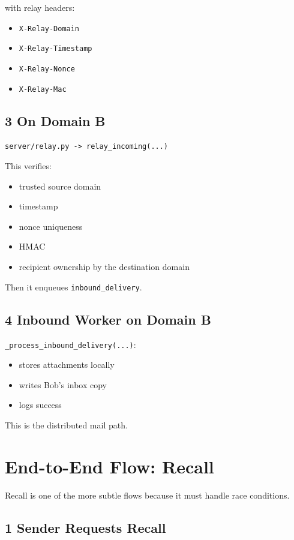 \documentclass[11pt,a4paper]{article}
\begin{document}
with relay headers:

\begin{itemize}
\item \nolinkurl{X-Relay-Domain}
\item \nolinkurl{X-Relay-Timestamp}
\item \nolinkurl{X-Relay-Nonce}
\item \nolinkurl{X-Relay-Mac}
\end{itemize}

\subsection{3 On Domain B}

\nolinkurl{server/relay.py -> relay_incoming(...)}

This verifies:

\begin{itemize}
\item trusted source domain
\item timestamp
\item nonce uniqueness
\item HMAC
\item recipient ownership by the destination domain
\end{itemize}

Then it enqueues \nolinkurl{inbound_delivery}.

\subsection{4 Inbound Worker on Domain B}

\nolinkurl{_process_inbound_delivery(...)}:

\begin{itemize}
\item stores attachments locally
\item writes Bob's inbox copy
\item logs success
\end{itemize}

This is the distributed mail path.


\section{End-to-End Flow: Recall}

Recall is one of the more subtle flows because it must handle race conditions.

\subsection{1 Sender Requests Recall}
\end{document}
